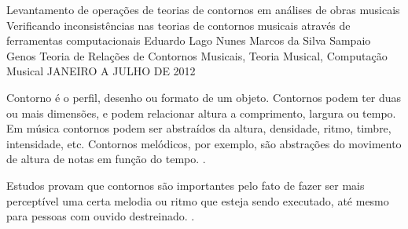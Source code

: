 \documentclass[11pt]{article}
\begin{document}
\graphicspath{{figs/}}


\dadosRelatorioFinal
{Levantamento de operações de teorias de contornos em análises de
  obras musicais}
{Verificando inconsistências nas teorias de contornos musicais através
  de ferramentas computacionais }
{Eduardo Lago Nunes}
{Marcos da Silva Sampaio}
{Genos}
{Teoria de Relações de Contornos Musicais, Teoria Musical, Computação Musical}
{JANEIRO A JULHO DE 2012}


\newpage

\setcounter{page}{1}
\onehalfspace

\label{sec:introducao}


Contorno é o perfil, desenho ou formato de um objeto. Contornos podem ter duas ou
mais dimensões, e podem relacionar altura a comprimento, largura ou tempo. Em música
contornos podem ser abstraídos da altura, densidade, ritmo, timbre, intensidade, etc.
Contornos melódicos, por exemplo, são abstrações do movimento de altura de notas em
função do tempo.
\cite[p. 01]{Sampaio2008}.

Estudos provam que contornos são importantes pelo fato de fazer ser
mais perceptível uma certa melodia ou ritmo que esteja sendo
executado, até mesmo para pessoas com ouvido destreinado.
\cite[p. 225]{Marvin1987}.
\end{document}

